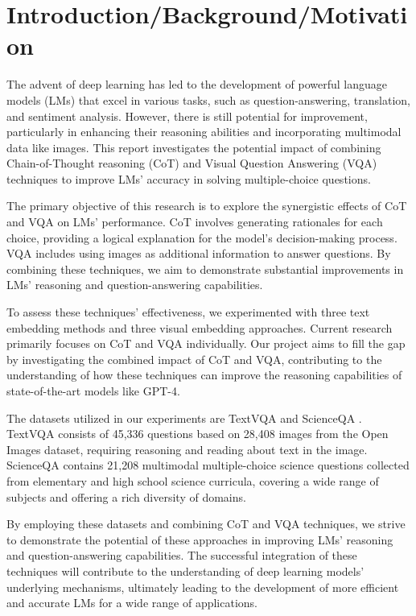 \documentclass[10pt,twocolumn,letterpaper]{article}
\begin{document}
\section{Introduction/Background/Motivation}

The advent of deep learning has led to the development of powerful language models (LMs) that excel in various tasks, such as question-answering, translation, and sentiment analysis. However, there is still potential for improvement, particularly in enhancing their reasoning abilities and incorporating multimodal data like images. This report investigates the potential impact of combining Chain-of-Thought reasoning (CoT) \cite{Wei22} and Visual Question Answering (VQA) \cite{Singh19} techniques to improve LMs' accuracy in solving multiple-choice questions.

The primary objective of this research is to explore the synergistic effects of CoT and VQA on LMs' performance. CoT involves generating rationales for each choice, providing a logical explanation for the model's decision-making process. VQA includes using images as additional information to answer questions. By combining these techniques, we aim to demonstrate substantial improvements in LMs' reasoning and question-answering capabilities.

To assess these techniques' effectiveness, we experimented with three text embedding methods and three visual embedding approaches. Current research primarily focuses on CoT and VQA individually. Our project aims to fill the gap by investigating the combined impact of CoT and VQA, contributing to the understanding of how these techniques can improve the reasoning capabilities of state-of-the-art models like GPT-4\cite{openai2023gpt4}.

The datasets utilized in our experiments are TextVQA \cite{TextVQA} and ScienceQA \cite{ScienceQA}. TextVQA consists of 45,336 questions based on 28,408 images from the Open Images dataset, requiring reasoning and reading about text in the image. ScienceQA contains 21,208 multimodal multiple-choice science questions collected from elementary and high school science curricula, covering a wide range of subjects and offering a rich diversity of domains. \cite{ScienceQA}

By employing these datasets and combining CoT and VQA techniques, we strive to demonstrate the potential of these approaches in improving LMs' reasoning and question-answering capabilities. The successful integration of these techniques will contribute to the understanding of deep learning models' underlying mechanisms, ultimately leading to the development of more efficient and accurate LMs for a wide range of applications.
\end{document}
